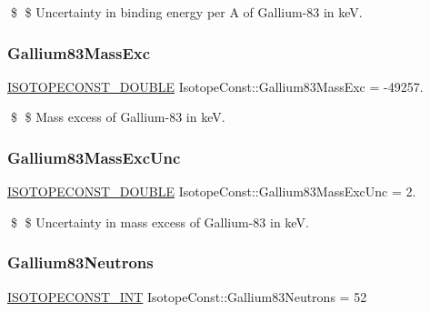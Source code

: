 \$ \$ Uncertainty in binding energy per A of Gallium-\/83 in keV. \mbox{\label{group___isotope_const-_gallium-_ga83_gabb8a637eeac85a47fb3b9ad7ef322934}} 
\subsubsection{\texorpdfstring{Gallium83\+Mass\+Exc}{Gallium83MassExc}}
{\footnotesize\ttfamily \mbox{\hyperlink{group___isotope_const-_macros_ga8f45a7272ce02c0b4c65c44636ed719a}{I\+S\+O\+T\+O\+P\+E\+C\+O\+N\+S\+T\+\_\+\+D\+O\+U\+B\+LE}} Isotope\+Const\+::\+Gallium83\+Mass\+Exc = -\/49257.}

\$ \$ Mass excess of Gallium-\/83 in keV. \mbox{\label{group___isotope_const-_gallium-_ga83_ga59e770236fc9253fd94c1864504096cb}} 
\subsubsection{\texorpdfstring{Gallium83\+Mass\+Exc\+Unc}{Gallium83MassExcUnc}}
{\footnotesize\ttfamily \mbox{\hyperlink{group___isotope_const-_macros_ga8f45a7272ce02c0b4c65c44636ed719a}{I\+S\+O\+T\+O\+P\+E\+C\+O\+N\+S\+T\+\_\+\+D\+O\+U\+B\+LE}} Isotope\+Const\+::\+Gallium83\+Mass\+Exc\+Unc = 2.}

\$ \$ Uncertainty in mass excess of Gallium-\/83 in keV. \mbox{\label{group___isotope_const-_gallium-_ga83_ga696f2ad19556b86b7cd582b1426db082}} 
\subsubsection{\texorpdfstring{Gallium83\+Neutrons}{Gallium83Neutrons}}
{\footnotesize\ttfamily \mbox{\hyperlink{group___isotope_const-_macros_ga5f18360b3e99483a35c32d789e62621c}{I\+S\+O\+T\+O\+P\+E\+C\+O\+N\+S\+T\+\_\+\+I\+NT}} Isotope\+Const\+::\+Gallium83\+Neutrons = 52}


